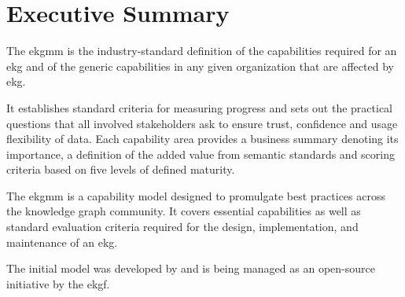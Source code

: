 \chapter{Executive Summary}\label{ch:ekg-mm-executive-summary}

The \gls{ekgmm} is the industry-standard definition of the capabilities required for an \gls{ekg} and
of the generic capabilities in any given organization that are affected by \gls{ekg}.

It establishes standard criteria for measuring progress and sets out the practical questions that all involved
stakeholders ask to ensure trust, confidence and usage flexibility of data.
Each capability area provides a business summary denoting its importance, a definition of the added value from
semantic standards and scoring criteria based on five levels of defined maturity.

The \gls{ekgmm} is a capability model designed to promulgate best practices across the knowledge graph community.
It covers essential capabilities as well as standard evaluation criteria required for the design, implementation,
and maintenance of an \gls{ekg}.

The initial model was developed by \agnos and is being managed as an open-source initiative by the \gls{ekgf}.
